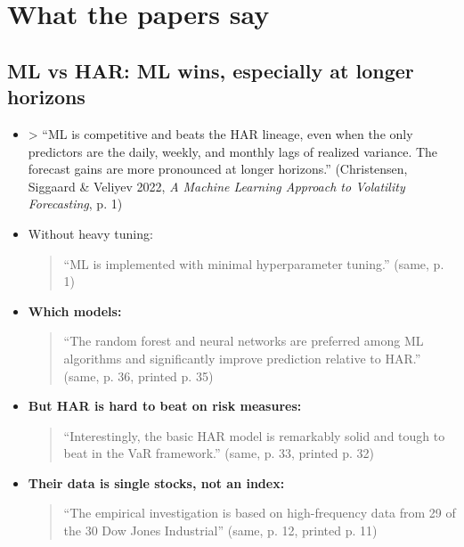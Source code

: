 \documentclass{article}
\begin{document}
\section{What the papers say}

\subsection{ML vs HAR: ML wins, especially at longer horizons}

\begin{itemize}

\item

> ``ML is competitive and beats the HAR lineage, even when the only predictors are the daily, weekly, and monthly lags of realized variance. The forecast gains are more pronounced at longer horizons.'' (Christensen, Siggaard \& Veliyev 2022, \emph{A Machine Learning Approach to Volatility Forecasting}, p. 1)

\item Without heavy tuning:

\begin{quote}``ML is implemented with minimal hyperparameter tuning.'' (same, p. 1)\end{quote}

\item \textbf{Which models:}

\begin{quote}``The random forest and neural networks are preferred among ML algorithms and significantly improve prediction relative to HAR.'' (same, p. 36, printed p. 35)\end{quote}

\item \textbf{But HAR is hard to beat on risk measures:}

\begin{quote}``Interestingly, the basic HAR model is remarkably solid and tough to beat in the VaR framework.'' (same, p. 33, printed p. 32)\end{quote}

\item \textbf{Their data is single stocks, not an index:}

\begin{quote}``The empirical investigation is based on high-frequency data from 29 of the 30 Dow Jones Industrial'' (same, p. 12, printed p. 11)\end{quote}

\end{itemize}
\end{document}
